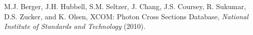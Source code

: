 \newpage
\begin{thebibliography}{99}

M.J. Berger, J.H. Hubbell, S.M. Seltzer, J. Chang, J.S. Coursey, R. Sukumar, D.S. Zucker, and K. Olsen, XCOM: Photon Cross Sections Database, \emph{National Institute of Standards and Technology} (2010).

\end{thebibliography}